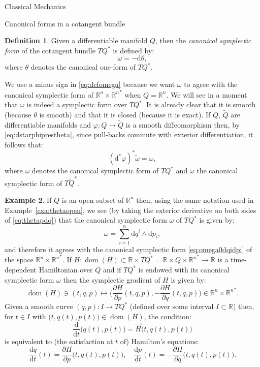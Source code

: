 \documentclass[oneside,a4paper,11pt]{amsbook}
\newcommand{\R}{\mathds R}
\newcommand{\dd}{\mathrm d}
\DeclareMathOperator{\Dom}{dom}
\theoremstyle{remark}\newtheorem{exercise}{Exercise}[chapter]
\theoremstyle{plain}\newtheorem{teo}{Theorem}[section]
\theoremstyle{plain}\newtheorem{lem}[teo]{Lemma}
\theoremstyle{plain}\newtheorem{prop}[teo]{Proposition}
\theoremstyle{plain}\newtheorem{cor}[teo]{Corollary}
\theoremstyle{definition}\newtheorem{defin}[teo]{Definition}
\theoremstyle{remark}\newtheorem{rem}[teo]{Remark}
\theoremstyle{definition}\newtheorem{notation}[teo]{Notation}
\theoremstyle{definition}\newtheorem{convention}[teo]{Convention}
\theoremstyle{definition}\newtheorem{example}[teo]{Example}
\numberwithin{section}{chapter}
\numberwithin{equation}{section}
\begin{document}
\begin{chapter}{Classical Mechanics}
\begin{section}{Canonical forms in a cotangent bundle}
\begin{defin}
Given a differentiable manifold $Q$, then the {\em canonical symplectic form\/} of the cotangent bundle $TQ^*$ is defined by:
\begin{equation}\label{eq:defomega}
\omega=-\dd\theta,
\end{equation}
where $\theta$ denotes the canonical one-form of $TQ^*$.
\end{defin}
We use a minus sign in \eqref{eq:defomega} because we want $\omega$ to agree with the canonical symplectic form of $\R^n\times{\R^n}^*$ when $Q=\R^n$. We will
see in a moment that $\omega$ is indeed a symplectic form over $TQ^*$. It is already clear that it is smooth (because $\theta$ is smooth)
and that it is closed (because it is exact).
If $Q$, $\widetilde Q$ are differentiable manifolds and $\varphi:Q\to\widetilde Q$ is a smooth diffeomorphism then, by \eqref{eq:dstarphiprestheta},
since pull-backs commute with exterior differentiation, it follows that:
\[(\dd^*\varphi)^*\widetilde\omega=\omega,\]
where $\omega$ denotes the canonical symplectic form of $TQ^*$ and $\widetilde\omega$ the canonical symplectic form of $T\widetilde Q^*$.

\begin{example}
If $Q$ is an open subset of $\R^n$ then, using the same notation used in Example~\ref{exa:thetaopen}, we see (by taking the exterior derivative
on both sides of \eqref{eq:thetapdq}) that the canonical symplectic
form $\omega$ of $TQ^*$ is given by:
\begin{equation}\label{eq:omegadqidpi}
\omega=\sum_{i=1}^n\dd q^i\wedge\dd p_i,
\end{equation}
and therefore it agrees with the canonical symplectic form \eqref{eq:omega0dqidpi} of the space $\R^n\times{\R^n}^*$.
If $H:\Dom(H)\subset\R\times TQ^*=\R\times Q\times{\R^n}^*\to\R$ is a time-dependent Hamiltonian over $Q$ and if
$TQ^*$ is endowed with its canonical symplectic form $\omega$ then the symplectic gradient of $H$ is given by:
\[\Dom(H)\ni(t,q,p)\longmapsto\Big(\frac{\partial H}{\partial p}(t,q,p),-\frac{\partial H}{\partial q}(t,q,p)\Big)
\in\R^n\times{\R^n}^*.\]
Given a smooth curve $(q,p):I\to TQ^*$ (defined over some interval $I\subset\R$) then, for $t\in I$
with $\big(t,q(t),p(t)\big)\in\Dom(H)$, the condition:
\[\frac{\dd}{\dd t}\big(q(t),p(t)\big)=\vec H\big(t,q(t),p(t)\big)\]
is equivalent to (the satisfaction at $t$ of) Hamilton's equations:
\begin{equation}\label{eq:Hameqagain}
\frac{\dd q}{\dd t}(t)=\frac{\partial H}{\partial p}\big(t,q(t),p(t)\big),\quad
\frac{\dd p}{\dd t}(t)=-\frac{\partial H}{\partial q}\big(t,q(t),p(t)\big).
\end{equation}
\end{example}


\end{section}
\end{chapter}
\end{document}
